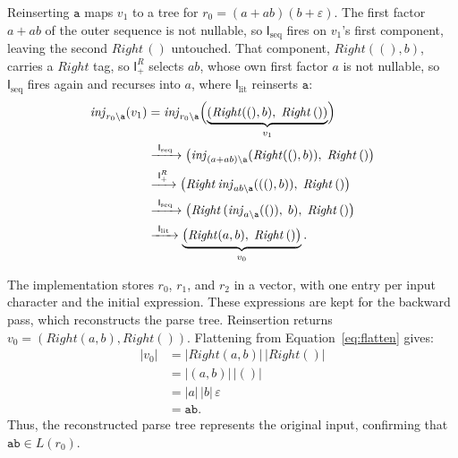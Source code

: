 Reinserting $\mathtt{a}$ maps $v_1$ to a tree for $r_0=(a+ab)(b+\varepsilon)$. 
The first factor $a+ab$ of the outer sequence is not nullable, 
so $\mathsf{I}_{\mathrm{seq}}$ fires on $v_1$'s first component, 
leaving the second $\mathit{Right}\,()$ untouched. 
That component, $\mathit{Right}((),b)$, carries a $\mathit{Right}$ tag, 
so $\mathsf{I}_{+}^{R}$ selects $ab$, 
whose own first factor $a$ is not nullable, 
so $\mathsf{I}_{\mathrm{seq}}$ fires again and recurses into $a$, 
where $\mathsf{I}_{\mathrm{lit}}$ reinserts $\mathtt{a}$:
\[
\begin{aligned}
\mathit{inj}_{r_0 \backslash \mathtt{a}}(v_1)
  &= \mathit{inj}_{r_0 \backslash \mathtt{a}}\Bigl(
       \underbrace{(\mathit{Right}((), b),\;
                    \mathit{Right}\,())}_{v_1}
     \Bigr)\\
  &\xrightarrow{\ \mathsf{I}_{\mathrm{seq}}\ }
    \bigl(\mathit{inj}_{(a+ab) \backslash \mathtt{a}}
          (\mathit{Right}((), b)),\;
          \mathit{Right}\,()\bigr)\\
  &\xrightarrow{\ \mathsf{I}_{+}^{R}\ }
    \bigl(\mathit{Right}\,
          \mathit{inj}_{ab \backslash \mathtt{a}}
          (((), b)),\;
          \mathit{Right}\,()\bigr)\\
  &\xrightarrow{\ \mathsf{I}_{\mathrm{seq}}\ }
    \bigl(\mathit{Right}\,
          (\mathit{inj}_{a \backslash \mathtt{a}}(()),\;
           b),\;
          \mathit{Right}\,()\bigr)\\
  &\xrightarrow{\ \mathsf{I}_{\mathrm{lit}}\ }
    \underbrace{\bigl(\mathit{Right}(a, b),\;
          \mathit{Right}\,()\bigr)}_{v_0}.
\end{aligned}
\]

The implementation stores $r_0$, $r_1$, and $r_2$ in a vector,
with one entry per input character and the initial expression.
These expressions are kept for the backward pass, which
reconstructs the parse tree. Reinsertion returns
$v_0 = (\mathit{Right}(a,b), \mathit{Right}())$.
Flattening from Equation~\eqref{eq:flatten} gives:
\[
\begin{aligned}
|v_0|
  &= |\mathit{Right}(a,b)|\,
     |\mathit{Right}()| \\
  &= |(a,b)|\,|()| \\
  &= |a|\,|b|\,\varepsilon \\
  &= \mathtt{ab}.
\end{aligned}
\]
Thus, the reconstructed parse tree represents the original
input, confirming that $\mathtt{ab} \in L(r_0)$.

%
%
%
%
%

